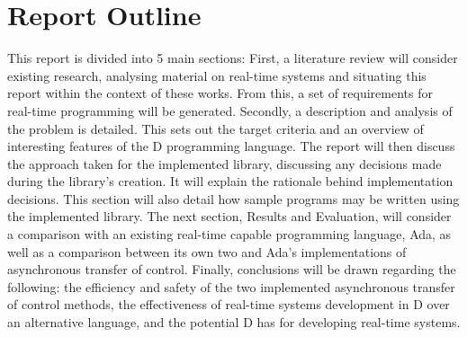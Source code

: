 \section{Report Outline} %
This report is divided into 5 main sections:
First, a literature review will 
consider existing research, analysing material on 
real-time systems and situating this report within the context of these works. 
From this, a set of requirements for real-time programming will be generated. 
Secondly, a description and analysis of the problem is detailed. This sets out 
the target criteria and an overview of interesting features of the D programming 
language. 
The report will then discuss the approach taken for the implemented library, 
discussing any decisions made during the library's creation. It will explain the 
rationale behind implementation decisions. This section will also detail 
how sample programs may be written using the implemented library. 
The next section, Results and Evaluation, will consider a comparison with an 
existing real-time capable programming language, Ada, as well as a comparison 
between its own two and Ada's implementations of asynchronous transfer of
control. 
Finally, conclusions will be drawn regarding the following: 
the efficiency and safety of the two implemented asynchronous transfer of control methods, 
the effectiveness of real-time systems development in D over an alternative language, 
and the potential D has for developing real-time systems.
